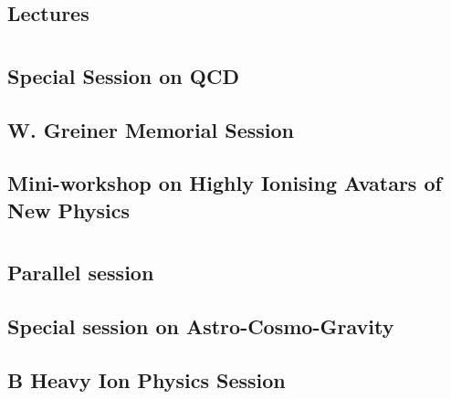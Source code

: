 

\tableofcontents
\clearpage
\section{}
\subsection{Lectures}

\clearpage

\section{}
\subsection{Special Session on QCD}

\clearpage

\subsection{W. Greiner Memorial Session}

\clearpage

\subsection{Mini-workshop on Highly Ionising Avatars of New Physics}

\clearpage

\section{}
\subsection{Parallel session}

\clearpage

\subsection{Special session on Astro-Cosmo-Gravity}

\clearpage

\subsection{B Heavy Ion Physics Session}

\clearpage

